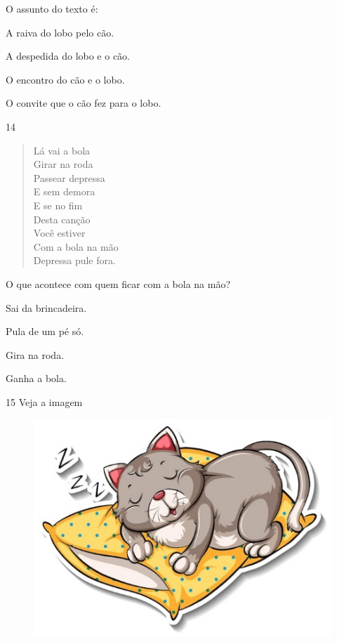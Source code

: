 
O assunto do texto é:

\begin{escolha}
\item A raiva do lobo pelo cão.

\item A despedida do lobo e o cão.

\item O encontro do cão e o lobo.

\item O convite que o cão fez para o lobo.
\end{escolha}


\num{14}

\begin{verse}
Lá vai a bola\\
Girar na roda\\
Passear depressa\\
E sem demora\\
E se no fim\\
Desta canção\\
Você estiver\\
Com a bola na mão\\
Depressa pule fora.
\end{verse}


O que acontece com quem ficar com a bola na mão?

\begin{escolha}
\item Sai da brincadeira.

\item Pula de um pé só.

\item Gira na roda.

\item Ganha a bola.
\end{escolha}


\num{15} Veja a imagem

\begin{figure}[htpb!]
\centering
\includegraphics[width=.5\textwidth]{media/image161.jpeg}
\end{figure}

